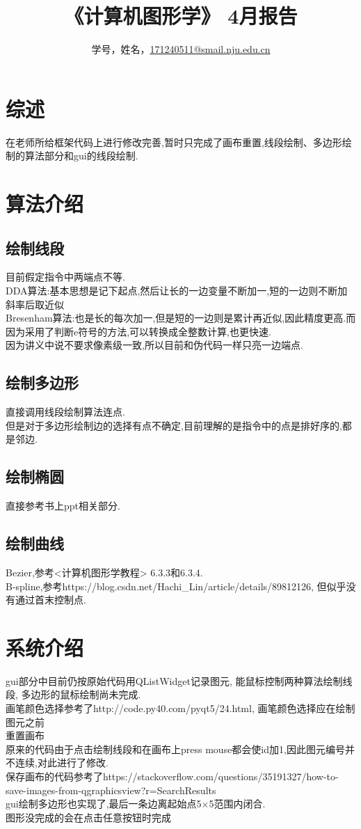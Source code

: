 \documentclass[a4paper,UTF8]{article}
\theoremstyle{definition}
\begin{document}
\title{\textbf{《计算机图形学》 4月报告 }}
\author{学号，姓名，\href{mailto:xxx@xxx.com}{171240511@smail.nju.edu.cn}}
\maketitle

\section{综述}
在老师所给框架代码上进行修改完善,暂时只完成了画布重置,线段绘制、多边形绘制的算法部分和gui的线段绘制.

\section{算法介绍}
\subsection{绘制线段}
目前假定指令中两端点不等.\\
\indent DDA算法:基本思想是记下起点,然后让长的一边变量不断加一,短的一边则不断加斜率后取近似\cite{rog_2002}\\
\indent Bresenham算法:也是长的每次加一,但是短的一边则是累计再近似,因此精度更高.而因为采用了判断e符号的方法,可以转换成全整数计算,也更快速.\cite{rog_2002}\\
\indent 因为讲义中说不要求像素级一致,所以目前和伪代码一样只亮一边端点.
\subsection{绘制多边形}
直接调用线段绘制算法连点.\\
\indent 但是对于多边形绘制边的选择有点不确定,目前理解的是指令中的点是排好序的,都是邻边.
\subsection{绘制椭圆}
\indent 直接参考书上ppt相关部分.
\subsection{绘制曲线}
\indent Bezier,参考<计算机图形学教程> 6.3.3和6.3.4.\\
\indent B-spline,参考https://blog.csdn.net/Hachi_Lin/article/details/89812126, 但似乎没有通过首末控制点.
\section{系统介绍}
gui部分中目前仍按原始代码用QListWidget记录图元, 能鼠标控制两种算法绘制线段,
多边形的鼠标绘制尚未完成.\\
画笔颜色选择参考了http://code.py40.com/pyqt5/24.html, 画笔颜色选择应在绘制图元之前\\
重置画布\\
原来的代码由于点击绘制线段和在画布上press mouse都会使id加1,因此图元编号并不连续,对此进行了修改.\\
保存画布的代码参考了https://stackoverflow.com/questions/35191327/how-to-save-images-from-qgraphicsview?r=SearchResults\\
gui绘制多边形也实现了,最后一条边离起始点5$\times$5范围内闭合.\\
图形没完成的会在点击任意按钮时完成
\end{document}
